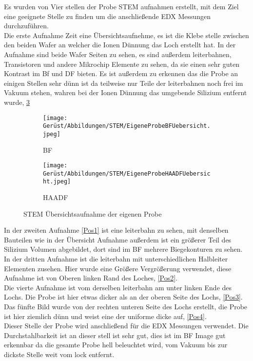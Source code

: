 Es wurden von Vier stellen der Probe STEM aufnahmen erstellt, mit dem Ziel eine geeignete Stelle zu finden um die anschließende EDX Messungen durchzuführen.\\
Die erste Aufnahme Zeit eine Übersichtsaufnehme, es ist die Klebe stelle zwischen den beiden Wafer an welcher die Ionen Dünnung das Loch erstellt hat. In der Aufnahme sind beide Wafer Seiten zu sehen, es sind außerdem leiterbahnen, Transistoren und andere Mikrochip Elemente zu sehen, da sie einen sehr guten Kontrast im Bf und DF bieten. Es ist außerdem zu erkennen das die Probe an einigen Stellen sehr dünn ist da teilweise nur Teile der leiterbahnen noch frei im Vakuum stehen, wahren bei der Ionen Dünnung das umgebende Silizium entfernt wurde, \cref{STEMEigeneProbeUebersicht}
\begin{figure}[H]
     \centering
     \begin{subfigure}[b]{0.49\textwidth}
         \centering
         \texttt{[image: Gerüst/Abbildungen/STEM/EigeneProbeBFUebersicht.jpeg]}
         \caption{BF}
         \label{UeberBF}
     \end{subfigure}
     \hfill
     \begin{subfigure}[b]{0.49\textwidth}
         \centering
         \texttt{[image: Gerüst/Abbildungen/STEM/EigeneProbeHAADFUebersicht.jpeg]}
         \caption{HAADF}
         \label{UeberDF}
     \end{subfigure}
        \caption{STEM Übersichtsaufnahme der eigenen Probe}
        \label{STEMEigeneProbeUebersicht}
\end{figure}
In der zweiten Aufnahme \cref{Pos1} ist eine leiterbahn zu sehen, mit denselben Bauteilen wie in der Übersicht Aufnahme außerdem ist ein größerer Teil des Silizium Volumen abgebildet, dort sind im BF mehrere Biegekonturen zu sehen.\\
In der dritten Aufnahme ist die leiterbahn mit unterschiedlichen Halbleiter Elementen zusehen. Hier wurde eine Größere Vergrößerung verwendet, diese Aufnahme ist von Oberen linken Rand des Loches, \cref{Pos2}.\\
Die vierte Aufnahme ist vom derselben leiterbahn am unter linken Ende des Lochs.  Die Probe ist hier etwas dicker als an der oberen Seite des Lochs, \cref{Pos3}.\\
Das fünfte Bild wurde von der rechten unteren Seite des Lochs erstellt, die Probe ist hier ziemlich dünn und weist eine der uniforme dicke auf, \cref{Pos4}.\\ 
Dieser Stelle der Probe wird anschließend für die EDX Messungen verwendet. Die Durchstahlbarkeit ist an dieser stell ist sehr gut, dies ist im BF Image gut erkennbar da die gesamte Probe hell beleuchtet wird, vom Vakuum bis zur dickste Stelle weit vom lock entfernt.\\
